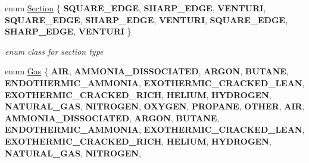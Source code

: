\begin{DoxyCompactItemize}
enum \hyperlink{class_flow_calculations_energy_use_afbabab0da698748de91369a5dfc7662a}{Section} \{ \newline
{\bfseries S\+Q\+U\+A\+R\+E\+\_\+\+E\+D\+GE}, 
{\bfseries S\+H\+A\+R\+P\+\_\+\+E\+D\+GE}, 
{\bfseries V\+E\+N\+T\+U\+RI}, 
{\bfseries S\+Q\+U\+A\+R\+E\+\_\+\+E\+D\+GE}, 
\newline
{\bfseries S\+H\+A\+R\+P\+\_\+\+E\+D\+GE}, 
{\bfseries V\+E\+N\+T\+U\+RI}, 
{\bfseries S\+Q\+U\+A\+R\+E\+\_\+\+E\+D\+GE}, 
{\bfseries S\+H\+A\+R\+P\+\_\+\+E\+D\+GE}, 
\newline
{\bfseries V\+E\+N\+T\+U\+RI}
 \}\begin{DoxyCompactList}\small\item\em enum class for section type \end{DoxyCompactList}
\item 
\mbox{\label{class_flow_calculations_energy_use_a840d5a836e7b05d6791b79bace4440f2}} 
enum \hyperlink{class_flow_calculations_energy_use_a840d5a836e7b05d6791b79bace4440f2}{Gas} \{ \newline
{\bfseries A\+IR}, 
{\bfseries A\+M\+M\+O\+N\+I\+A\+\_\+\+D\+I\+S\+S\+O\+C\+I\+A\+T\+ED}, 
{\bfseries A\+R\+G\+ON}, 
{\bfseries B\+U\+T\+A\+NE}, 
\newline
{\bfseries E\+N\+D\+O\+T\+H\+E\+R\+M\+I\+C\+\_\+\+A\+M\+M\+O\+N\+IA}, 
{\bfseries E\+X\+O\+T\+H\+E\+R\+M\+I\+C\+\_\+\+C\+R\+A\+C\+K\+E\+D\+\_\+\+L\+E\+AN}, 
{\bfseries E\+X\+O\+T\+H\+E\+R\+M\+I\+C\+\_\+\+C\+R\+A\+C\+K\+E\+D\+\_\+\+R\+I\+CH}, 
{\bfseries H\+E\+L\+I\+UM}, 
\newline
{\bfseries H\+Y\+D\+R\+O\+G\+EN}, 
{\bfseries N\+A\+T\+U\+R\+A\+L\+\_\+\+G\+AS}, 
{\bfseries N\+I\+T\+R\+O\+G\+EN}, 
{\bfseries O\+X\+Y\+G\+EN}, 
\newline
{\bfseries P\+R\+O\+P\+A\+NE}, 
{\bfseries O\+T\+H\+ER}, 
{\bfseries A\+IR}, 
{\bfseries A\+M\+M\+O\+N\+I\+A\+\_\+\+D\+I\+S\+S\+O\+C\+I\+A\+T\+ED}, 
\newline
{\bfseries A\+R\+G\+ON}, 
{\bfseries B\+U\+T\+A\+NE}, 
{\bfseries E\+N\+D\+O\+T\+H\+E\+R\+M\+I\+C\+\_\+\+A\+M\+M\+O\+N\+IA}, 
{\bfseries E\+X\+O\+T\+H\+E\+R\+M\+I\+C\+\_\+\+C\+R\+A\+C\+K\+E\+D\+\_\+\+L\+E\+AN}, 
\newline
{\bfseries E\+X\+O\+T\+H\+E\+R\+M\+I\+C\+\_\+\+C\+R\+A\+C\+K\+E\+D\+\_\+\+R\+I\+CH}, 
{\bfseries H\+E\+L\+I\+UM}, 
{\bfseries H\+Y\+D\+R\+O\+G\+EN}, 
{\bfseries N\+A\+T\+U\+R\+A\+L\+\_\+\+G\+AS}, 
\newline
{\bfseries N\+I\+T\+R\+O\+G\+EN}, 

\end{DoxyCompactItemize}
